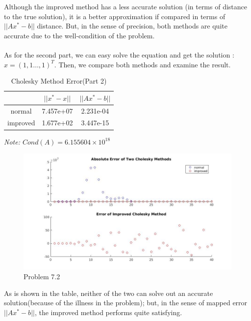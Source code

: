 \documentclass[11pt]{article}
\begin{document}
Although the improved method has a less accurate solution (in terms of distance to the true solution), it is a better approximation if compared in terms of $||Ax^*-b||$ distance.
But, in the sense of precision, both methods are quite accurate due to the well-condition of the problem.
\\\\
\newpage
As for the second part, we can easy solve the equation and get the solution : $x = (1, 1 \dots , 1)^T$. 
Then, we compare both methods and examine the result.
\begin{table}[ht]
	\caption{Cholesky Method Error(Part 2)}
	\centering
	\begin{tabular}{c|cc}
		\hline
		& $||x^*-x||$ & $||Ax^*-b||$ \\
		\hline
		normal   & 7.457e+07 & 2.231e-04 \\
		improved & 1.677e+02 & 3.447e-15 \\
		\hline
	\end{tabular}
	
	\emph{Note: $Cond(A)=6.155604\times 10^{18}$}
\end{table}

\begin{figure}[ht]
	\centering
	\caption{Problem 7.2}
	\includegraphics[width=\textwidth]{cholesky2.jpg}
\end{figure}

As is shown in the table, neither of the two can solve out an accurate solution(because of the illness in the problem); but, in the sense of mapped error $||Ax^*-b||$, the improved method performs quite satisfying.
\end{document}
